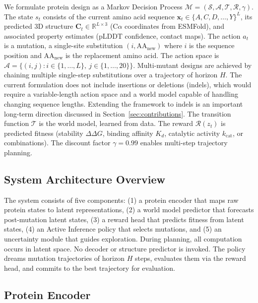 \documentclass[12pt, a4paper]{article}
\begin{document}
We formulate protein design as a Markov Decision Process $\mathcal{M} = (\mathcal{S}, \mathcal{A}, \mathcal{T}, \mathcal{R}, \gamma)$. The state $s_t$ consists of the current amino acid sequence $\mathbf{x}_t \in \{A, C, D, \ldots, Y\}^L$, its predicted 3D structure $\mathbf{C}_t \in \mathbb{R}^{L \times 3}$ (C$\alpha$ coordinates from ESMFold), and associated property estimates (pLDDT confidence, contact maps). The action $a_t$ is a mutation, a single-site substitution $(i, \text{AA}_\text{new})$ where $i$ is the sequence position and $\text{AA}_\text{new}$ is the replacement amino acid. The action space is $\mathcal{A} = \{(i, j) : i \in \{1,\ldots,L\},\ j \in \{1,\ldots,20\}\}$. Multi-mutant designs are achieved by chaining multiple single-step substitutions over a trajectory of horizon $H$. The current formulation does not include insertions or deletions (indels), which would require a variable-length action space and a world model capable of handling changing sequence lengths. Extending the framework to indels is an important long-term direction discussed in Section~\ref{sec:contributions}. The transition function $\mathcal{T}$ is the world model, learned from data. The reward $\mathcal{R}(z_t)$ is predicted fitness (stability $\Delta\Delta G$, binding affinity $K_d$, catalytic activity $k_\text{cat}$, or combinations). The discount factor $\gamma = 0.99$ enables multi-step trajectory planning.

\subsection{System Architecture Overview}

The system consists of five components: (1) a protein encoder that maps raw protein states to latent representations, (2) a world model predictor that forecasts post-mutation latent states, (3) a reward head that predicts fitness from latent states, (4) an Active Inference policy that selects mutations, and (5) an uncertainty module that guides exploration. During planning, all computation occurs in latent space. No decoder or structure predictor is invoked. The policy dreams mutation trajectories of horizon $H$ steps, evaluates them via the reward head, and commits to the best trajectory for evaluation.

\subsection{Protein Encoder}
\end{document}
